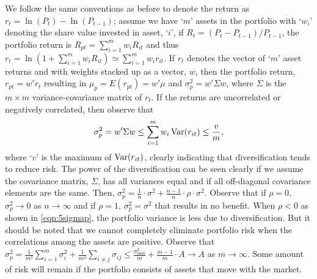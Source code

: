 We follow the same conventions as before to denote the return as $r_t= \ln(P_t) - \ln(P_{t-1})$; assume we have `$m$' assets in the portfolio with `$w_i$' denoting the share value invested in asset, `$i$', if $R_t=(P_t-P_{t-1})/P_{t-1}$, the portfolio return is $R_{pt}= \sum_{i=1}^m w_i R_{it}$ and thus $r_t= \ln \left(1+\sum_{i=1}^m w_i R_{it} \right) \simeq \sum_{i=1}^m w_i r_{it}$. If $r_t$ denotes the vector of `$m$' asset returns and with weights stacked up as a vector, $w$, then the portfolio return, $r_{pt}= w' r_t$ resulting in $\mu_p= E(r_{pt})= w' \mu$ and $\sigma_p^2= w' \Sigma w$, where $\Sigma$ is the $m \times m$ variance-covariance matrix of $r_t$. If the returns are uncorrelated or negatively correlated, then observe that
	\begin{equation} \label{eqn:5sigmap}
	\sigma_p^2= w' \Sigma w \leq \sum_{i=1}^m w_i \var(r_{it}) \leq \dfrac{v}{m},
	\end{equation}
where `$v$' is the maximum of $\operatorname{Var}(r_{it})$, clearly indicating that diversification tends to reduce risk. The power of the diversification can be seen clearly if we assume the covariance matrix, $\Sigma$, has all variances equal and if all off-diagonal covariance elements are the same. Then, $\sigma_p^2= \frac{1}{n} \cdot \sigma^2 + \frac{n-1}{n} \cdot \rho \cdot \sigma^2$. Observe that if $\rho= 0$, $\sigma_p^2 \to 0$ as $n \to \infty$ and if $\rho= 1$, $\sigma_p^2= \sigma^2$ that results in no benefit. When $\rho < 0$ as shown in \eqref{eqn:5sigmap}, the portfolio variance is less due to diversification. But it should be noted that we cannot completely eliminate portfolio risk when the correlations among the assets are positive. Observe that $\sigma_p^2= \frac{1}{m^2} \sum_{i=1}^m \sigma_i^2 + \frac{1}{m^2} \sum_{i \neq j} \sigma_{ij} \leq \frac{\sigma_{\text{max}}^2}{m} + \frac{m-1}{m} \cdot A \to A$ as $m \to \infty$. Some amount of risk will remain if the portfolio consists of assets that move with the market. \twomedskip


